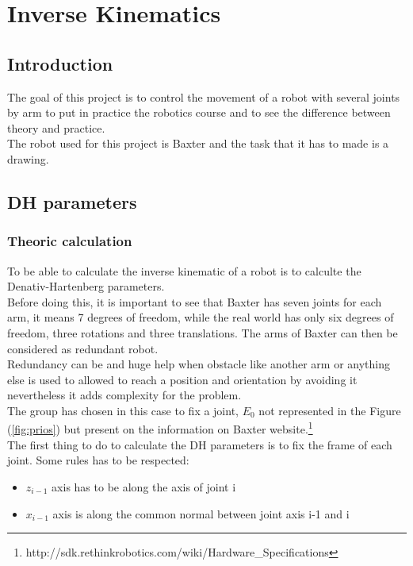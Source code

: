 \chapter{Inverse Kinematics}
\label{chap:inv kin}
\section{Introduction}

The goal of this project is to control the movement of a robot with several joints by arm to put in practice the robotics course and to see the difference between theory and practice.\\
The robot used for this project is Baxter and the task that it has to made is a drawing.

\section{DH parameters}
\subsection{Theoric calculation}
To be able to calculate the inverse kinematic of a robot is to calculte the Denativ-Hartenberg parameters. \\
Before doing this, it is important to see that Baxter has seven joints for each arm, it means 7 degrees of freedom, while the real world has only six degrees of freedom, three rotations and three translations. The arms of Baxter can then be considered as redundant robot.\\
Redundancy can be and huge help when obstacle like another arm or anything else is used to allowed to reach a position and orientation by avoiding it nevertheless it adds complexity for the problem.\\
The group has chosen in this case to fix a joint, $E_0$ not represented in the Figure (\ref{fig:prios}) but present on the information on Baxter website.\footnote{http://sdk.rethinkrobotics.com/wiki/Hardware\_Specifications} \\

The first thing to do to calculate the DH parameters is to fix the frame of each joint. Some rules has to be respected: \\
\begin{itemize}
\item $z_{i-1}$ axis has to be along the axis of joint i
\item $x_{i-1}$ axis is along the common normal between joint axis i-1 and i
\end{itemize}

